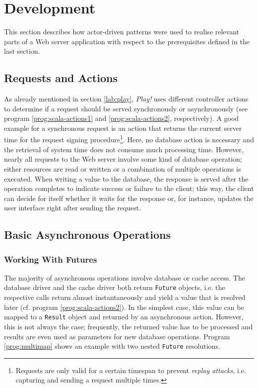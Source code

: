 \section{Development}
\label{lab:impl-dev}

This section describes how actor-driven patterns were used to realise relevant parts of a Web server application with respect to the prerequisites defined in the last section.

\subsection{Requests and Actions}
As already mentioned in section \ref{lab:play}, \textit{Play!} uses different controller actions to determine if a request should be served synchronously or asynchronously (see program \ref{prog:scala-actions1} and \ref{prog:scala-actions2}, respectively). A good example for a synchronous request is an action that returns the current server time for the request signing procedure\footnote{Requests are only valid for a certain timespan to prevent \textit{replay attacks}, i.e. capturing and sending a request multiple times.}. Here, no database action is necessary and the retrieval of system time does not consume much processing time. However, nearly all requests to the Web server involve some kind of database operation; either resources are read or written or a combination of multiple operations is executed. When writing a value to the database, the response is served after the operation completes to indicate success or failure to the client; this way, the client can decide for itself whether it waits for the response or, for instance, updates the user interface right after sending the request.

\subsection{Basic Asynchronous Operations}
\label{lab:basicasync}



\subsubsection*{Working With Futures}
The majority of asynchronous operations involve database or cache access. The database driver and the cache driver both return \texttt{Future} objects, i.e. the respective calls return almost instantaneously and yield a value that is resolved later (cf. program \ref{prog:scala-actions2}). In the simplest case, this value can be mapped to a \texttt{Result} object and returned by an asynchronous action. However, this is not always the case; frequently, the returned value has to be processed and results are even used as parameters for new database operations. Program \ref{prog:multimap} shows an example with two nested \texttt{Future} resolutions.

